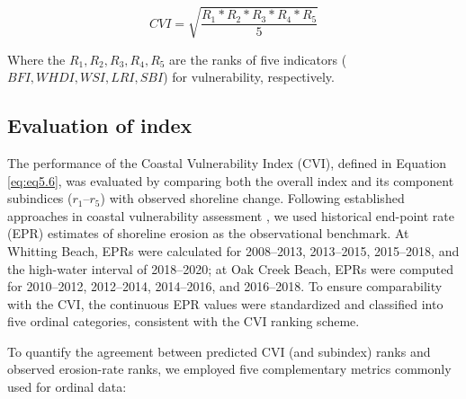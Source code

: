 \begin{equation}
    CVI = \sqrt{\frac{R_1*R_2*R_3*R_4*R_5}{5}}
\label{eq:eq5.6}
\end{equation}

Where the $R_1,R_2,R_3,R_4,R_5$ are the ranks of five indicators ($BFI, WHDI, WSI,LRI,
SBI$) for vulnerability, respectively.

\subsection{Evaluation of index}
\label{Evaluation of index}
The performance of the Coastal Vulnerability Index (CVI), defined in Equation
\ref{eq:eq5.6}, was evaluated by comparing both the overall index and its
component subindices ($r_{1}$–$r_{5}$) with observed shoreline change. Following
established approaches in coastal vulnerability assessment
\citep[\eg][]{fuller2002bank,thieler2000national}, we used historical end-point
rate (EPR) estimates of shoreline erosion as the observational benchmark. At
Whitting Beach, EPRs were calculated for 2008–2013, 2013–2015, 2015–2018, and
the high-water interval of 2018–2020; at Oak Creek Beach, EPRs were computed for
2010–2012, 2012–2014, 2014–2016, and 2016–2018. To ensure comparability with the
CVI, the continuous EPR values were standardized and classified into five
ordinal categories, consistent with the CVI ranking scheme.  

To quantify the agreement between predicted CVI (and subindex) ranks and
observed erosion-rate ranks, we employed five complementary metrics commonly
used for ordinal data:

